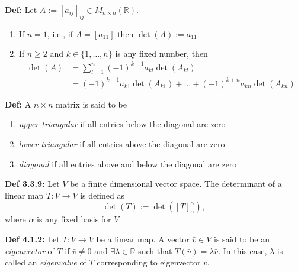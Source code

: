 \bigskip 

\noindent 
\textbf{Def:} Let $A := [a_{ij}]_{ij} \in M_{n \times n}(\mathbb{R})$.
\begin{enumerate}
    \item If $n = 1$, i.e., if $A = [a_{11}]$ then $\det(A) := a_{11}$.
    \item If $n \ge 2$ and $k \in \{1, \ldots , n \}$ is any fixed number, then 
\begin{align*}
    \det(A) &= \sum_{l = 1}^{n} (-1)^{k + 1} a_{kl} \det(A_{kl}) \\
            &= (-1)^{k + 1} a_{k1} \det(A_{k1}) + \ldots + (-1)^{k + n} a_{kn} \det(A_{kn}) 
\end{align*}
\end{enumerate}

\noindent 
\textbf{Def:} A $n \times n$ matrix is said to be 
\begin{enumerate}
    \item \textit{upper triangular} if all entries below the diagonal are zero
    \item \textit{lower triangular} if all entries above the diagonal are zero
    \item \textit{diagonal} if all entries above and below the diagonal are zero
\end{enumerate}

\bigskip 

\noindent 
\textbf{Def 3.3.9:} Let $V$ be a finite dimensional vector space. The determinant of a linear map $T:V\rightarrow V$ is defined as 
\[\det(T) := \det([T]_\alpha^\alpha),\] 
where $\alpha$ is any fixed basis for $V$.

\bigskip 

\noindent 
\textbf{Def 4.1.2:} Let $T: V \rightarrow V$ be a linear map. A vector $\bar v \in V$ is said to be an \textit{eigenvector} of $T$ if $\bar v \ne \bar 0$ and $\exists \lambda \in \mathbb{R}$ such that $T(\bar v)=\lambda \bar v$. In this case, $\lambda$ is called an \textit{eigenvalue} of $T$ corresponding to eigenvector $\bar v$.